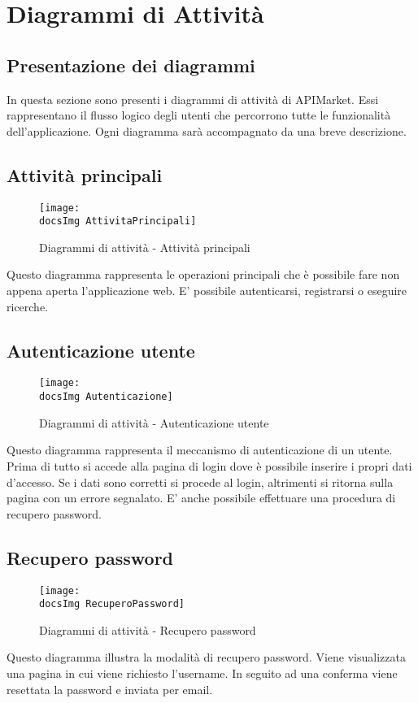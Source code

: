 \section{Diagrammi di Attività}{
	\subsection{Presentazione dei diagrammi}{
		In questa sezione sono presenti i diagrammi di attività di APIMarket. Essi rappresentano il flusso logico degli utenti che percorrono tutte le funzionalità dell'applicazione. Ogni diagramma sarà accompagnato da una breve descrizione.
	}
	\subsection{Attività principali}{
		\begin{figure}[H]
			\centering
			\texttt{[image: \\docsImg AttivitaPrincipali]}
			\caption{Diagrammi di attività - Attività principali}
		\end{figure}
			Questo diagramma rappresenta le operazioni principali che è possibile fare non appena aperta l'applicazione web. E' possibile autenticarsi, registrarsi o eseguire ricerche. 	
	}
	\subsection{Autenticazione utente} {
		\begin{figure}[H]
			\centering
			\texttt{[image: \\docsImg Autenticazione]}
			\caption{Diagrammi di attività - Autenticazione utente}
		\end{figure}
			Questo diagramma rappresenta il meccanismo di autenticazione di un utente. Prima di tutto si accede alla pagina di login dove è possibile inserire i propri dati d'accesso. Se i dati sono corretti si procede al login, altrimenti si ritorna sulla pagina con un errore segnalato. E' anche possibile effettuare una procedura di recupero password. 
	}
	\subsection{Recupero password}{
		\begin{figure}[H]
			\centering
			\texttt{[image: \\docsImg RecuperoPassword]}
			\caption{Diagrammi di attività - Recupero password}
		\end{figure}
			Questo diagramma illustra la modalità di recupero password. Viene visualizzata una pagina in cui viene richiesto l'username. In seguito ad una conferma viene resettata la password e inviata per email.
	}
}
